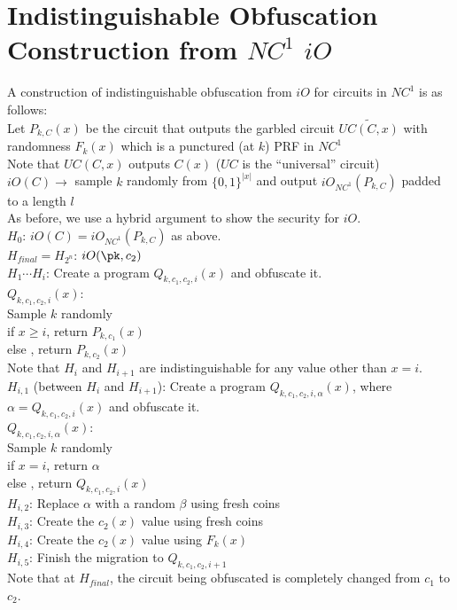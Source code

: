\documentclass[12pt]{tufte-book}
\begin{document}
\section{Indistinguishable Obfuscation Construction from $NC^1$ $iO$}
A construction of indistinguishable obfuscation from $iO$ for circuits in $NC^1$ is as follows:\\
Let $P_{k,C}(x)$ be the circuit that outputs the garbled circuit $\widetilde{UC(C,x)}$ with randomness $F_k(x)$ which is a punctured (at $k$) PRF in $NC^1$\\
\indent Note that $UC(C,x)$ outputs $C(x)$ ($UC$ is the ``universal'' circuit)\\
$iO(C) \rightarrow $ sample $k$ randomly from $\{0,1\}^{|x|}$ and output $iO_{NC^1}(P_{k,C})$ padded to a length $l$\\

As before, we use a hybrid argument to show the security for $iO$.\\
\noindent $H_0$: $iO(C) = iO_{NC^1}(P_{k,C})$ as above.\\
\noindent $H_{final} = H_{2^n}$: $iO(\pk, c_2)$\\
\noindent $H_1 \cdots H_i$: Create a program $Q_{k, c_1, c_2, i}(x)$ and obfuscate it.\\
$Q_{k,c_1,c_2,i}(x)$:\\
\indent Sample $k$ randomly\\
\indent if $x \ge i$, return $P_{k,c_1}(x)$\\
\indent else , return $P_{k,c_2}(x)$\\
\noindent Note that $H_i$ and $H_{i+1}$ are indistinguishable for any value other than $x=i$.\\
\noindent $H_{i,1}$ (between $H_i$ and $H_{i+1}$): Create a program $Q_{k, c_1, c_2, i, \alpha}(x)$, where $\alpha = Q_{k, c_1, c_2, i}(x)$ and obfuscate it.\\
$Q_{k, c_1, c_2, i, \alpha}(x)$:\\
\indent Sample $k$ randomly\\
\indent if $x = i$, return $\alpha$\\
\indent else , return $Q_{k,c_1,c_2, i}(x)$\\

\noindent $H_{i,2}$: Replace $\alpha$ with a random $\beta$ using fresh coins\\
\noindent $H_{i,3}$: Create the $c_2(x)$ value using fresh coins\\
\noindent $H_{i,4}$: Create the $c_2(x)$ value using $F_k(x)$\\
\noindent $H_{i,5}$: Finish the migration to $Q_{k,c_1,c_2,i+1}$\\

Note that at $H_{final}$, the circuit being obfuscated is completely changed from $c_1$ to $c_2$.




 




\backmatter



\end{document}
